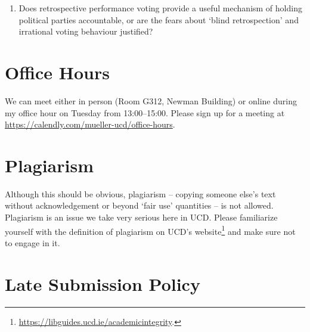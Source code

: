 \documentclass[abstract=on,parskip=full,headings=standardclasses,fontsize=11pt,paper=a4]{scrartcl}
\begin{document}
\begin{enumerate}
\item Does retrospective performance voting provide a useful mechanism of holding political parties accountable, or are the fears about `blind retrospection' and irrational voting behaviour justified?




\end{enumerate}



\section*{Office Hours}

We can meet either in person (Room G312, Newman Building) or online during my office hour on Tuesday from 13:00--15:00. Please sign up for a meeting at  \href{https://calendly.com/mueller-ucd/15min}{https://calendly.com/mueller-ucd/office-hours}.  


\section*{Plagiarism}

Although this should be obvious, plagiarism -- copying someone else's text without acknowledgement or beyond `fair use' quantities -- is not allowed. Plagiarism is an issue we take very serious here in UCD. Please familiarize yourself with the definition of plagiarism on UCD's website\footnote{\url{https://libguides.ucd.ie/academicintegrity}.} and make sure not to engage in it.



\section*{Late Submission Policy}
\end{document}
